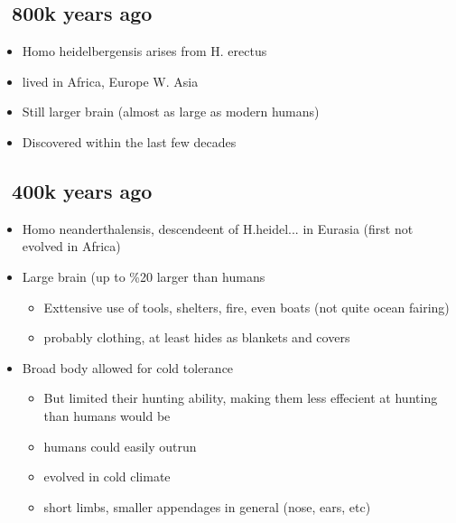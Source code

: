 \documentclass{article}
\theoremstyle{definition}
\begin{document}
\subsection{~800k years ago}

\begin{itemize}
	\item Homo heidelbergensis arises from H. erectus
	\item lived in Africa, Europe W. Asia
	\item Still larger brain (almost as large as modern humans)
	\item Discovered within the last few decades
\end{itemize}

\subsection{~400k years ago}
\begin{itemize}
	\item Homo neanderthalensis, descendeent of H.heidel... in Eurasia (first not evolved in Africa)
	\item Large brain (up to \%20 larger than humans
		\begin{itemize}
			\item Exttensive use of tools, shelters, fire, even boats (not quite ocean fairing)
			\item probably clothing, at least hides as blankets and covers
		\end{itemize}
	\item Broad body allowed for cold tolerance
		\begin{itemize}
			\item But limited their hunting ability, making them less effecient at hunting than humans would be
			\item humans could easily outrun
			\item evolved in cold climate
			\item short limbs, smaller appendages in general (nose, ears, etc)
		\end{itemize}
\end{itemize}
\end{document}
